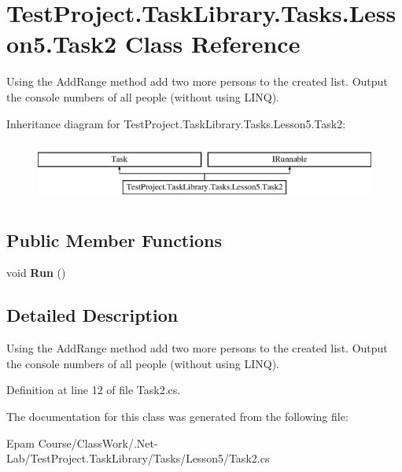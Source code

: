 \hypertarget{class_test_project_1_1_task_library_1_1_tasks_1_1_lesson5_1_1_task2}{}\section{Test\+Project.\+Task\+Library.\+Tasks.\+Lesson5.\+Task2 Class Reference}
\label{class_test_project_1_1_task_library_1_1_tasks_1_1_lesson5_1_1_task2}


Using the Add\+Range method add two more persons to the created list. Output the console numbers of all people (without using L\+I\+NQ).  


Inheritance diagram for Test\+Project.\+Task\+Library.\+Tasks.\+Lesson5.\+Task2\+:\begin{figure}[H]
\begin{center}
\leavevmode
\includegraphics[height=2.000000cm]{class_test_project_1_1_task_library_1_1_tasks_1_1_lesson5_1_1_task2}
\end{center}
\end{figure}
\subsection*{Public Member Functions}
\begin{DoxyCompactItemize}
\item 
\mbox{\label{class_test_project_1_1_task_library_1_1_tasks_1_1_lesson5_1_1_task2_ad0eb860223ca2744b64aea6573d71189}} 
void {\bfseries Run} ()
\end{DoxyCompactItemize}


\subsection{Detailed Description}
Using the Add\+Range method add two more persons to the created list. Output the console numbers of all people (without using L\+I\+NQ). 



Definition at line 12 of file Task2.\+cs.



The documentation for this class was generated from the following file\+:\begin{DoxyCompactItemize}
\item 
Epam Course/\+Class\+Work/.\+Net-\/\+Lab/\+Test\+Project.\+Task\+Library/\+Tasks/\+Lesson5/Task2.\+cs\end{DoxyCompactItemize}
